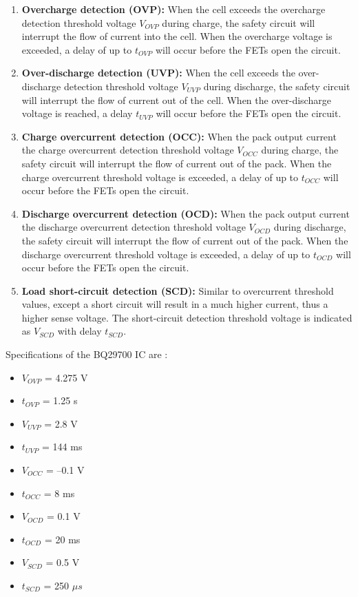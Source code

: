 \documentclass[11pt,a4paper]{article}
\begin{document}
\begin{enumerate}
	\item \textbf{Overcharge detection (OVP):} When the cell exceeds the overcharge detection threshold voltage $V_{OVP}$ during charge, the safety circuit will interrupt the flow of current into the cell.%
	When the overcharge voltage is exceeded, a delay of up to $t_{OVP}$ will occur before the FETs open the circuit.
	\item \textbf{Over-discharge detection (UVP):} When the cell exceeds the over-discharge detection threshold voltage $V_{UVP}$ during discharge, the safety circuit will interrupt the flow of current out of the cell.%
	When the over-discharge voltage is reached, a delay $t_{UVP}$ will occur before the FETs open the circuit.
	\item \textbf{Charge overcurrent detection (OCC):} When the pack output current the charge overcurrent detection threshold voltage $V_{OCC}$ during charge, the safety circuit will interrupt the flow of current out of the pack. When the charge overcurrent threshold voltage is exceeded, a delay of up to $t_{OCC}$ will occur before the FETs open the circuit.
	\item \textbf{Discharge overcurrent detection (OCD):} When the pack output current the discharge overcurrent detection threshold voltage $V_{OCD}$ during discharge, the safety circuit will interrupt the flow of current out of the pack. When the discharge overcurrent threshold voltage is exceeded, a delay of up to $t_{OCD}$ will occur before the FETs open the circuit.
	\item \textbf{Load short-circuit detection (SCD):} Similar to overcurrent threshold values, except a short circuit will result in a much higher current, thus a higher sense voltage. The short-circuit detection threshold voltage is indicated as $V_{SCD}$ with delay $t_{SCD}$.
\end{enumerate}
Specifications of the BQ29700 IC are \cite{bib:BQ29700}:
\begin{itemize}
	\item $V_{OVP}$ = 4.275 V
	\item $t_{OVP}$ = 1.25 s
	\item $V_{UVP}$ = 2.8 V
	\item $t_{UVP}$ = 144 ms
	\item $V_{OCC}$ = –0.1 V
	\item $t_{OCC}$ = 8 ms
	\item $V_{OCD}$ = 0.1 V
	\item $t_{OCD}$ = 20 ms
	\item $V_{SCD}$ = 0.5 V
	\item $t_{SCD}$ = 250 $\mu s$
\end{itemize}
\end{document}
